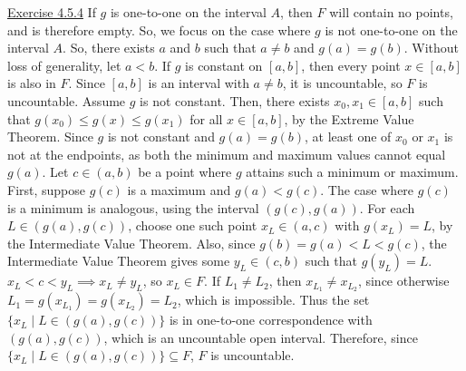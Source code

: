 \documentclass{exam}
\begin{document}
\underline{Exercise 4.5.4}
\newline
\newline
If $g$ is one-to-one on the interval $A$, then $F$ will contain no points, and is therefore empty. So, we focus on the case where $g$ is not one-to-one on the interval $A$. So, there exists $a$ and $b$ such that $a\ne b$ and $g(a)=g(b)$. Without loss of generality, let $a<b$. If $g$ is constant on $[a,b]$, then every point $x\in[a,b]$ is also in $F$. Since $[a,b]$ is an interval with $a\ne b$, it is uncountable, so $F$ is uncountable. Assume $g$ is not constant. Then, there exists $x_0,x_1\in[a,b]$ such that $g(x_0)\le g(x)\le g(x_1)$ for all $x\in[a,b]$, by the Extreme Value Theorem. Since $g$ is not constant and $g(a)=g(b)$, at least one of $x_0$ or $x_1$ is not at the endpoints, as both the minimum and maximum values cannot equal $g(a)$. Let $c\in(a,b)$ be a point where $g$ attains such a minimum or maximum.
\newline
\newline
First, suppose $g(c)$ is a maximum and $g(a)<g(c)$. The case where $g(c)$ is a minimum is analogous, using the interval $(g(c),g(a))$. For each $L\in(g(a),g(c))$, choose one such point $x_L\in(a,c)$ with $g(x_L)=L$, by the Intermediate Value Theorem. Also, since $g(b)=g(a)<L<g(c)$, the Intermediate Value Theorem gives some $y_L\in(c,b)$ such that $g(y_L)=L$. $x_L<c<y_L\implies x_L\ne y_L$, so $x_L\in F$. If $L_1\ne L_2$, then $x_{L_1}\ne x_{L_2}$, since otherwise $L_1=g(x_{L_1})=g(x_{L_2})=L_2$, which is impossible. Thus the set $\{x_L\mid L\in(g(a),g(c))\}$ is in one-to-one correspondence with $(g(a),g(c))$, which is an uncountable open interval. Therefore, since $\{x_L\mid L\in(g(a),g(c))\}\subseteq F$, $F$ is uncountable.
\newline
\end{document}
